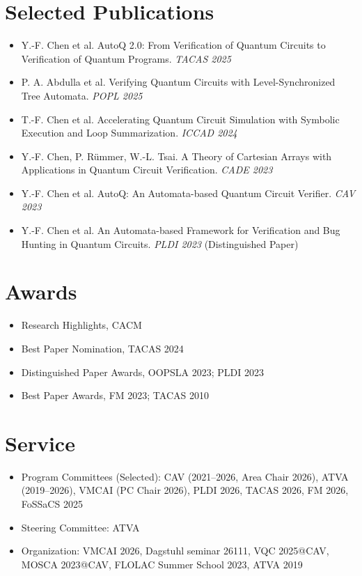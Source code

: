 \documentclass[11pt]{article}
\begin{document}
\section*{Selected Publications}
\begin{itemize}
  \item Y.-F. Chen et al. AutoQ 2.0: From Verification of Quantum Circuits to Verification of Quantum Programs. \textit{TACAS 2025}
  \item P. A. Abdulla et al. Verifying Quantum Circuits with Level-Synchronized Tree Automata. \textit{POPL 2025}
  \item T.-F. Chen et al. Accelerating Quantum Circuit Simulation with Symbolic Execution and Loop Summarization. \textit{ICCAD 2024}
  \item Y.-F. Chen, P. Rümmer, W.-L. Tsai. A Theory of Cartesian Arrays with Applications in Quantum Circuit Verification. \textit{CADE 2023}
  \item Y.-F. Chen et al. AutoQ: An Automata-based Quantum Circuit Verifier. \textit{CAV 2023}
  \item Y.-F. Chen et al. An Automata-based Framework for Verification and Bug Hunting in Quantum Circuits. \textit{PLDI 2023} (Distinguished Paper)
\end{itemize}

\section*{Awards}
\begin{itemize}
  \item Research Highlights, CACM
  \item Best Paper Nomination, TACAS 2024
  \item Distinguished Paper Awards, OOPSLA 2023; PLDI 2023
  \item Best Paper Awards, FM 2023; TACAS 2010
\end{itemize}

\section*{Service}
\begin{itemize}
  \item Program Committees (Selected): CAV (2021–2026, Area Chair 2026), ATVA (2019–2026), VMCAI (PC Chair 2026), PLDI 2026, TACAS 2026, FM 2026, FoSSaCS 2025
  \item Steering Committee: ATVA
  \item Organization: VMCAI 2026, Dagstuhl seminar 26111, VQC 2025@CAV, MOSCA 2023@CAV, FLOLAC Summer School 2023, ATVA 2019
\end{itemize}
\end{document}
